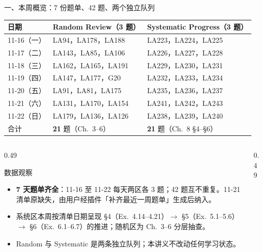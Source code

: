 \documentclass[aspectratio=169,10pt,fontset=none]{ctexbeamer}
\begin{document}
\begin{frame}[t]{一、本周概览：7 份题单、42 题、两个独立队列}
  \label{sec:overview}
  \centering
  \scriptsize
  \setlength{\tabcolsep}{3pt}
  \renewcommand{\arraystretch}{1.12}
  \begin{tabular}{@{}l l l@{}}
    \toprule
    日期 & Random Review（3 题） & Systematic Progress（3 题）\\
    \midrule
    11-16（一） & LA94，LA178，LA188 & LA223，LA224，LA225\\
    11-17（二） & LA143，LA85，LA106 & LA226，LA227，LA228\\
    11-18（三） & LA162，LA165，LA191 & LA229，LA230，LA231\\
    11-19（四） & LA147，LA177，G20 & LA232，LA233，LA234\\
    11-20（五） & LA91，LA81，LA175 & LA235，LA236，LA237\\
    \rowcolor{ink!7} 11-21（六） & LA131，LA170，LA154 & LA241，LA242，LA243\\
    \rowcolor{ink!7} 11-22（日） & LA179，LA136，LA126 & LA238，LA239，LA240\\
    \midrule
    合计 & \textbf{21} 题（Ch.~3--6） & \textbf{21} 题（Ch.~8 \S4--\S6）\\
    \bottomrule
  \end{tabular}
  \vspace{0.35em}
  \raggedright
  \begin{columns}[T,onlytextwidth]
    \begin{column}{0.49\textwidth}
      \begin{exampleblock}{\footnotesize 数据观察}
        \scriptsize
        \begin{itemize}\setlength{\itemsep}{1pt}
          \item \textbf{7 天题单齐全}：11-16 至 11-22 每天两区各 3 题；42 题互不重复。11-21 清单原缺失，由用户经插件「补齐最近一周题单」生成后纳入。
          \item 系统区本周按清单日期呈现 \S4（Ex.~4.14--4.21）$\to$ \S5（Ex.~5.1--5.6）$\to$ \S6（Ex.~6.1--6.7）的推进；随机区为 Ch.~3--6 分层抽查。
          \item Random 与 Systematic 是两条独立队列；本讲义不改动任何学习状态。
        \end{itemize}
      \end{exampleblock}
    \end{column}
    \begin{column}{0.49\textwidth}

\end{column}
\end{columns}
\end{frame}
\end{document}
